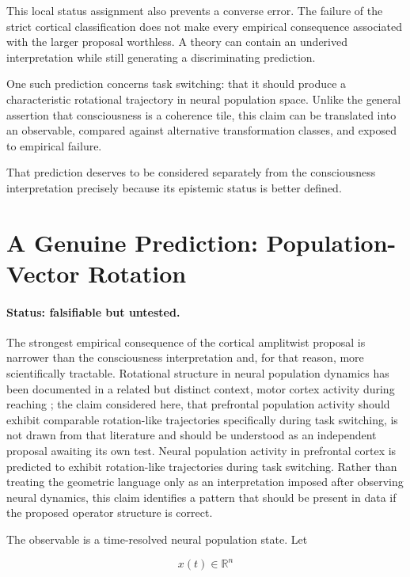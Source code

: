 \documentclass[11pt]{article}
\begin{document}
This local status assignment also prevents a converse error. The failure of the strict cortical classification does not make every empirical consequence associated with the larger proposal worthless. A theory can contain an underived interpretation while still generating a discriminating prediction.

One such prediction concerns task switching: that it should produce a characteristic rotational trajectory in neural population space. Unlike the general assertion that consciousness is a coherence tile, this claim can be translated into an observable, compared against alternative transformation classes, and exposed to empirical failure.

That prediction deserves to be considered separately from the consciousness interpretation precisely because its epistemic status is better defined.

\section{A Genuine Prediction: Population-Vector Rotation}

\paragraph{Status: falsifiable but untested.}

The strongest empirical consequence of the cortical amplitwist proposal is narrower than the consciousness interpretation and, for that reason, more scientifically tractable. Rotational structure in neural population dynamics has been documented in a related but distinct context, motor cortex activity during reaching \citep{Churchland2012}; the claim considered here, that prefrontal population activity should exhibit comparable rotation-like trajectories specifically during task switching, is not drawn from that literature and should be understood as an independent proposal awaiting its own test. Neural population activity in prefrontal cortex is predicted to exhibit rotation-like trajectories during task switching. Rather than treating the geometric language only as an interpretation imposed after observing neural dynamics, this claim identifies a pattern that should be present in data if the proposed operator structure is correct.

The observable is a time-resolved neural population state. Let

\begin{equation}
x(t)\in\mathbb R^n
\end{equation}
\end{document}
